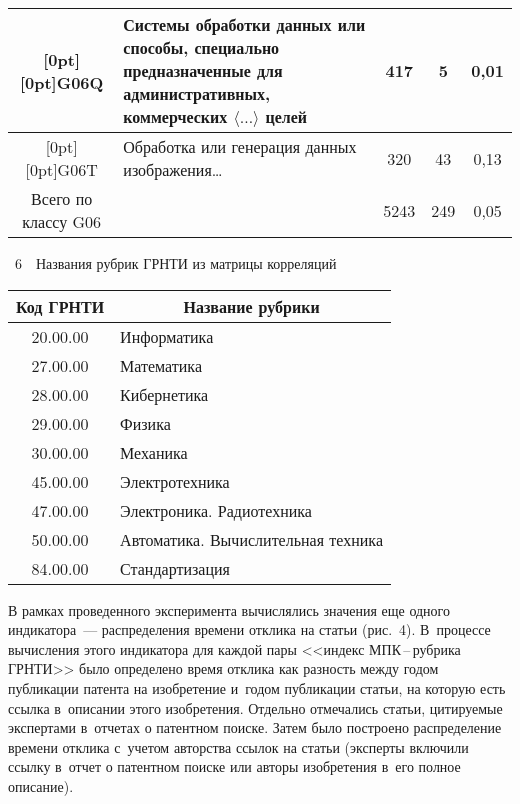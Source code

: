 \begin{table*}
\begin{center}
\begin{tabular}{|c|p{70mm}|c|c|c|}
\hline
\multicolumn{1}{|c|}{\raisebox{-12pt}[0pt][0pt]{G06Q}}&
Системы обработки данных или способы, специально предназначенные для
административных,
коммерческих $\langle\ldots\rangle$ целей&417\hphantom{9}&\hphantom{9}5&0,01\\
\hline
\multicolumn{1}{|c|}{\raisebox{-6pt}[0pt][0pt]{G06T}}&
Обработка или генерация данных изображения\ldots&320\hphantom{9}&43&0,13\\
\hline
Всего по классу G06&&5243\hphantom{99}&249\hphantom{9}&0,05\\
\hline
\end{tabular}
\end{center}
\vspace*{6pt}
\end{table*}

\begin{multicols}{2}

\noindent
{{\tablename~6}\ \ \small{Названия рубрик ГРНТИ из матрицы корреляций}}

\vspace*{2pt}

{\small\begin{center}
\begin{tabular}{|c|l|}
\hline
Код ГРНТИ&\multicolumn{1}{c|}{Название рубрики}\\
\hline
20.00.00&Информатика\\
27.00.00&Математика\\
28.00.00&Кибернетика\\
29.00.00&Физика\\
30.00.00&Механика\\
45.00.00&Электротехника\\
47.00.00&Электроника. Радиотехника\\
50.00.00&Автоматика. Вычислительная техника\\
84.00.00&Стандартизация\\
\hline
\end{tabular}
\end{center}}

\vspace*{12pt}





  В рамках проведенного эксперимента вычислялись значения еще одного индикатора~---
распределения времени отклика на статьи (рис.~4). В~процессе вычисления этого
индикатора для каждой пары <<индекс МПК\,--\,руб\-ри\-ка ГРНТИ>> было определено
время отклика как разность между годом публикации патента на изобретение и~годом
публикации статьи, на которую есть ссылка в~описании этого изобретения. Отдельно
отмечались статьи, цитируемые экспертами в~отчетах о патентном поиске. Затем было
построено распределение времени отклика с~учетом авторства ссылок на статьи (эксперты
включили ссылку в~отчет о патентном поиске или авторы изобретения в~его полное
описание).




\end{multicols}
